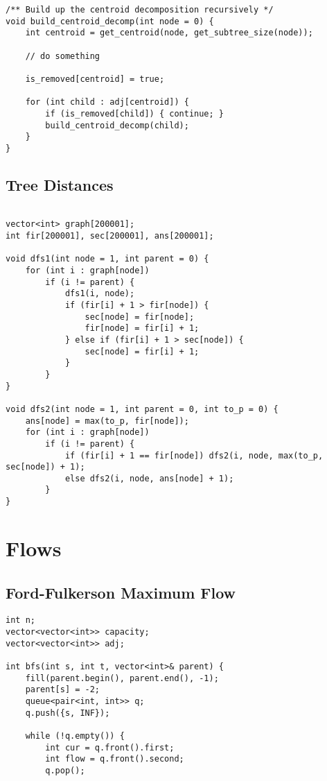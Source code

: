 \documentclass[10pt]{article}
\begin{document}
\begin{multicols*}{2}
\begin{lstlisting}[style=compactcpp]
/** Build up the centroid decomposition recursively */
void build_centroid_decomp(int node = 0) {
	int centroid = get_centroid(node, get_subtree_size(node));

	// do something

	is_removed[centroid] = true;

	for (int child : adj[centroid]) {
		if (is_removed[child]) { continue; }
		build_centroid_decomp(child);
	}
}

\end{lstlisting}

\subsection{Tree Distances}

\begin{lstlisting}[style=compactcpp]
	
vector<int> graph[200001];
int fir[200001], sec[200001], ans[200001];

void dfs1(int node = 1, int parent = 0) {
	for (int i : graph[node])
		if (i != parent) {
			dfs1(i, node);
			if (fir[i] + 1 > fir[node]) {
				sec[node] = fir[node];
				fir[node] = fir[i] + 1;
			} else if (fir[i] + 1 > sec[node]) {
				sec[node] = fir[i] + 1;
			}
		}
}

void dfs2(int node = 1, int parent = 0, int to_p = 0) {
	ans[node] = max(to_p, fir[node]);
	for (int i : graph[node])
		if (i != parent) {
			if (fir[i] + 1 == fir[node]) dfs2(i, node, max(to_p, sec[node]) + 1);
			else dfs2(i, node, ans[node] + 1);
		}
}
\end{lstlisting}

\section{Flows}

\subsection{Ford-Fulkerson Maximum Flow}

\begin{lstlisting}[style=compactcpp]
int n;
vector<vector<int>> capacity;
vector<vector<int>> adj;

int bfs(int s, int t, vector<int>& parent) {
    fill(parent.begin(), parent.end(), -1);
    parent[s] = -2;
    queue<pair<int, int>> q;
    q.push({s, INF});

    while (!q.empty()) {
        int cur = q.front().first;
        int flow = q.front().second;
        q.pop();


\end{lstlisting}
\end{multicols*}
\end{document}
